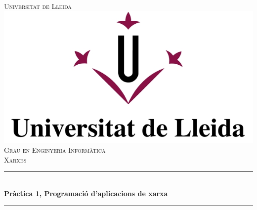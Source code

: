 \documentclass[11pt]{article}
\begin{document}
\begin{titlepage}

\newcommand{\HRule}{\rule{\linewidth}{0.5mm}} %

\center %
 

\textsc{\LARGE Universitat de Lleida}\\[1.5cm] %
\includegraphics{Images/logoUDL.jpg}\\[1cm] %
\textsc{\Large Grau en Enginyeria Informàtica}\\[0.5cm] %
\textsc{\large Xarxes}\\[0.5cm] %


\HRule \\[0.4cm]
{ \huge \bfseries Pràctica 1, Programació d’aplicacions de xarxa}\\[0.4cm] %
\HRule \\[1.5cm]
 


\end{titlepage}
\end{document}
